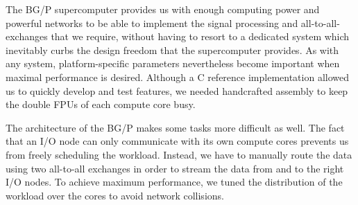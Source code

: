\documentclass{llncs}
\begin{document}
The BG/P supercomputer provides us with enough computing power and powerful networks to be able to implement the signal processing and all-to-all-exchanges that we require, without having to resort to a dedicated system which inevitably curbs the design freedom that the supercomputer provides. As with any system, platform-specific parameters nevertheless become important when maximal performance is desired. Although a C reference implementation allowed us to quickly develop and test features, we needed handcrafted assembly to keep the double FPUs of each compute core busy.

The architecture of the BG/P makes some tasks more difficult as well. The fact that an I/O node can only communicate with its own compute cores prevents us from freely scheduling the workload. Instead, we have to manually route the data using two all-to-all exchanges in order to stream the data from and to the right I/O nodes. To achieve maximum performance, we tuned the distribution of the workload over the cores to avoid network collisions.



\end{document}
